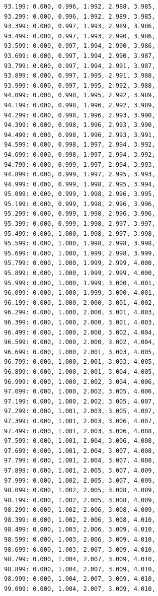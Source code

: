 \documentclass[12pt, a4paper]{article}
\begin{document}
\begin{scriptsize}
\begin{ttfamily}
\begin{lstlisting}
93.199: 0.000, 0.996, 1.992, 2.988, 3.985, 
93.299: 0.000, 0.996, 1.992, 2.989, 3.985, 
93.399: 0.000, 0.997, 1.993, 2.989, 3.986, 
93.499: 0.000, 0.997, 1.993, 2.990, 3.986, 
93.599: 0.000, 0.997, 1.994, 2.990, 3.986, 
93.699: 0.000, 0.997, 1.994, 2.990, 3.987, 
93.799: 0.000, 0.997, 1.994, 2.991, 3.987, 
93.899: 0.000, 0.997, 1.995, 2.991, 3.988, 
93.999: 0.000, 0.997, 1.995, 2.992, 3.988, 
94.099: 0.000, 0.998, 1.995, 2.992, 3.989, 
94.199: 0.000, 0.998, 1.996, 2.992, 3.989, 
94.299: 0.000, 0.998, 1.996, 2.993, 3.990, 
94.399: 0.000, 0.998, 1.996, 2.993, 3.990, 
94.499: 0.000, 0.998, 1.996, 2.993, 3.991, 
94.599: 0.000, 0.998, 1.997, 2.994, 3.992, 
94.699: 0.000, 0.998, 1.997, 2.994, 3.992, 
94.799: 0.000, 0.999, 1.997, 2.994, 3.993, 
94.899: 0.000, 0.999, 1.997, 2.995, 3.993, 
94.999: 0.000, 0.999, 1.998, 2.995, 3.994, 
95.099: 0.000, 0.999, 1.998, 2.996, 3.995, 
95.199: 0.000, 0.999, 1.998, 2.996, 3.996, 
95.299: 0.000, 0.999, 1.998, 2.996, 3.996, 
95.399: 0.000, 0.999, 1.998, 2.997, 3.997, 
95.499: 0.000, 1.000, 1.998, 2.997, 3.998, 
95.599: 0.000, 1.000, 1.998, 2.998, 3.998, 
95.699: 0.000, 1.000, 1.999, 2.998, 3.999, 
95.799: 0.000, 1.000, 1.999, 2.999, 4.000, 
95.899: 0.000, 1.000, 1.999, 2.999, 4.000, 
95.999: 0.000, 1.000, 1.999, 3.000, 4.001, 
96.099: 0.000, 1.000, 1.999, 3.000, 4.001, 
96.199: 0.000, 1.000, 2.000, 3.001, 4.002, 
96.299: 0.000, 1.000, 2.000, 3.001, 4.003, 
96.399: 0.000, 1.000, 2.000, 3.001, 4.003, 
96.499: 0.000, 1.000, 2.000, 3.002, 4.004, 
96.599: 0.000, 1.000, 2.000, 3.002, 4.004, 
96.699: 0.000, 1.000, 2.001, 3.003, 4.005, 
96.799: 0.000, 1.000, 2.001, 3.003, 4.005, 
96.899: 0.000, 1.000, 2.001, 3.004, 4.005, 
96.999: 0.000, 1.000, 2.002, 3.004, 4.006, 
97.099: 0.000, 1.000, 2.002, 3.005, 4.006, 
97.199: 0.000, 1.000, 2.002, 3.005, 4.007, 
97.299: 0.000, 1.001, 2.003, 3.005, 4.007, 
97.399: 0.000, 1.001, 2.003, 3.006, 4.007, 
97.499: 0.000, 1.001, 2.003, 3.006, 4.008, 
97.599: 0.000, 1.001, 2.004, 3.006, 4.008, 
97.699: 0.000, 1.001, 2.004, 3.007, 4.008, 
97.799: 0.000, 1.001, 2.004, 3.007, 4.008, 
97.899: 0.000, 1.001, 2.005, 3.007, 4.009, 
97.999: 0.000, 1.002, 2.005, 3.007, 4.009, 
98.099: 0.000, 1.002, 2.005, 3.008, 4.009, 
98.199: 0.000, 1.002, 2.005, 3.008, 4.009, 
98.299: 0.000, 1.002, 2.006, 3.008, 4.009, 
98.399: 0.000, 1.002, 2.006, 3.008, 4.010, 
98.499: 0.000, 1.003, 2.006, 3.009, 4.010, 
98.599: 0.000, 1.003, 2.006, 3.009, 4.010, 
98.699: 0.000, 1.003, 2.007, 3.009, 4.010, 
98.799: 0.000, 1.004, 2.007, 3.009, 4.010, 
98.899: 0.000, 1.004, 2.007, 3.009, 4.010, 
98.999: 0.000, 1.004, 2.007, 3.009, 4.010, 
99.099: 0.000, 1.004, 2.007, 3.009, 4.010, 

\end{lstlisting}
\end{ttfamily}
\end{scriptsize}
\end{document}
